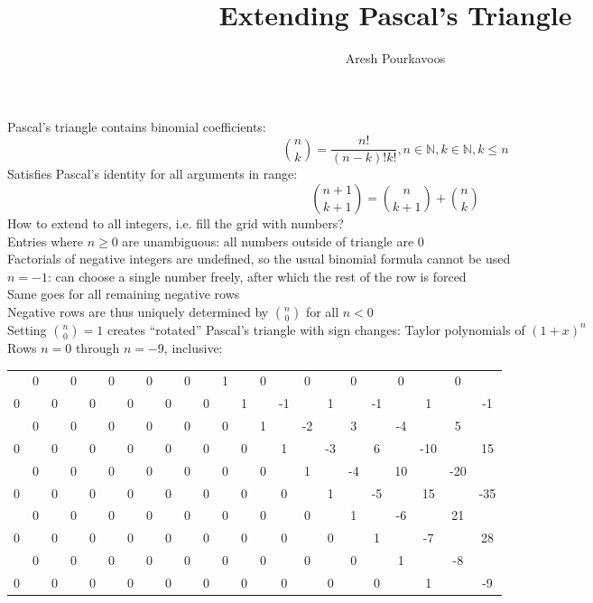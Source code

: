 \documentclass{article}
\begin{document}
\title{Extending Pascal's Triangle}
\author{Aresh Pourkavoos}
\maketitle

Pascal's triangle contains binomial coefficients:
\[
\binom{n}{k} = \frac{n!}{(n-k)!k!},
n \in \mathbb{N}, k \in \mathbb{N}, k \leq n
\]
Satisfies Pascal's identity for all arguments in range:
\[\binom{n+1}{k+1} = \binom{n}{k+1}+\binom{n}{k}\]
How to extend to all integers,
i.e. fill the grid with numbers? \\
Entries where $n \geq 0$ are unambiguous:
all numbers outside of triangle are 0 \\
Factorials of negative integers are undefined,
so the usual binomial formula cannot be used \\
$n = -1$: can choose a single number freely,
after which the rest of the row is forced \\
Same goes for all remaining negative rows \\
Negative rows are thus uniquely determined by $\binom{n}{0}$ for all $n < 0$ \\
Setting $\binom{n}{0}=1$ creates ``rotated'' Pascal's triangle with sign changes:
Taylor polynomials of $(1+x)^n$ \\
Rows $n=0$ through $n=-9$, inclusive:
\setlength{\tabcolsep}{2pt}
\begin{center}
  \begin{tabular}{c c*{21}{ c}}
    & 0 && 0 && 0 && 0 && 0 && 1 && 0 && 0 && 0 && 0 && 0 \\
    0 && 0 && 0 && 0 && 0 && 0 && 1 && -1 && 1 && -1 && 1 && -1 \\
    & 0 && 0 && 0 && 0 && 0 && 0 && 1 && -2 && 3 && -4 && 5 \\
    0 && 0 && 0 && 0 && 0 && 0 && 0 && 1 && -3 && 6 && -10 && 15 \\
    & 0 && 0 && 0 && 0 && 0 && 0 && 0 && 1 && -4 && 10 && -20 \\
    0 && 0 && 0 && 0 && 0 && 0 && 0 && 0 && 1 && -5 && 15 && -35 \\
    & 0 && 0 && 0 && 0 && 0 && 0 && 0 && 0 && 1 && -6 && 21 \\
    0 && 0 && 0 && 0 && 0 && 0 && 0 && 0 && 0 && 1 && -7 && 28 \\
    & 0 && 0 && 0 && 0 && 0 && 0 && 0 && 0 && 0 && 1 && -8 \\
    0 && 0 && 0 && 0 && 0 && 0 && 0 && 0 && 0 && 0 && 1 && -9 \\
  \end{tabular}
\end{center}
\end{document}
